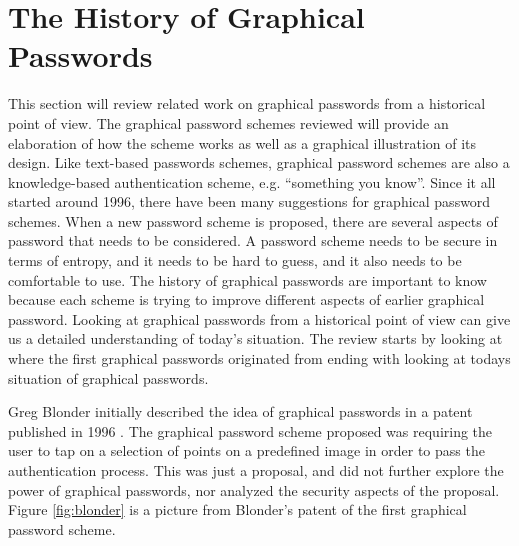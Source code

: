 \section{The History of Graphical Passwords} \label{sec:historygraphicalpasswords}
	 
  This section will review related work on graphical passwords from a historical point of view. The graphical password schemes reviewed will provide an elaboration of how the scheme works as well as a graphical illustration of its design. Like text-based passwords schemes, graphical password schemes are also a knowledge-based authentication scheme, e.g. ``something you know''. Since it all started around 1996, there have been many suggestions for graphical password schemes. When a new password scheme is proposed, there are several aspects of password that needs to be considered. A password scheme needs to be secure in terms of entropy, and it needs to be hard to guess, and it also needs to be comfortable to use. The history of graphical passwords are important to know because each scheme is trying to improve different aspects of earlier graphical password. Looking at graphical passwords from a historical point of view can give us a detailed understanding of today's situation. The review starts by looking at where the first graphical passwords originated from ending with looking at todays situation of graphical passwords.

  Greg Blonder initially described the idea of graphical passwords in a patent published in 1996 \cite{Blonder}. The graphical password scheme proposed was requiring the user to tap on a selection of points on a predefined image in order to pass the authentication process. This was just a proposal, and did not further explore the power of graphical passwords, nor analyzed the security aspects of the proposal. Figure \ref{fig:blonder} is a picture from Blonder's patent of the first graphical password scheme.

